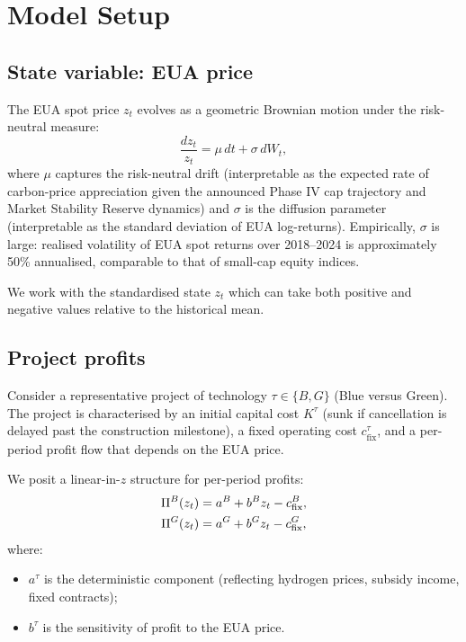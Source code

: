 \section{Model Setup}
\label{sec:ch3-setup}

\subsection{State variable: EUA price}

The EUA spot price $z_t$ evolves as a geometric Brownian motion under the risk-neutral measure:
\begin{equation}
\frac{dz_t}{z_t} = \mu \, dt + \sigma \, dW_t,
\end{equation}
where $\mu$ captures the risk-neutral drift (interpretable as the expected rate of carbon-price appreciation given the announced Phase IV cap trajectory and Market Stability Reserve dynamics) and $\sigma$ is the diffusion parameter (interpretable as the standard deviation of EUA log-returns). Empirically, $\sigma$ is large: realised volatility of EUA spot returns over 2018--2024 is approximately 50\% annualised, comparable to that of small-cap equity indices.

We work with the standardised state $z_t$ which can take both positive and negative values relative to the historical mean.

\subsection{Project profits}

Consider a representative project of technology $\tau \in \{B, G\}$ (Blue versus Green). The project is characterised by an initial capital cost $K^{\tau}$ (sunk if cancellation is delayed past the construction milestone), a fixed operating cost $c^{\tau}_{\mathrm{fix}}$, and a per-period profit flow that depends on the EUA price.

We posit a linear-in-$z$ structure for per-period profits:
\begin{align}
\Pi^{B}(z_t) &= a^B + b^B z_t - c^{B}_{\mathrm{fix}}, \\
\Pi^{G}(z_t) &= a^G + b^G z_t - c^{G}_{\mathrm{fix}},
\end{align}
where:
\begin{itemize}
    \item $a^{\tau}$ is the deterministic component (reflecting hydrogen prices, subsidy income, fixed contracts);
    \item $b^{\tau}$ is the sensitivity of profit to the EUA price.
\end{itemize}

